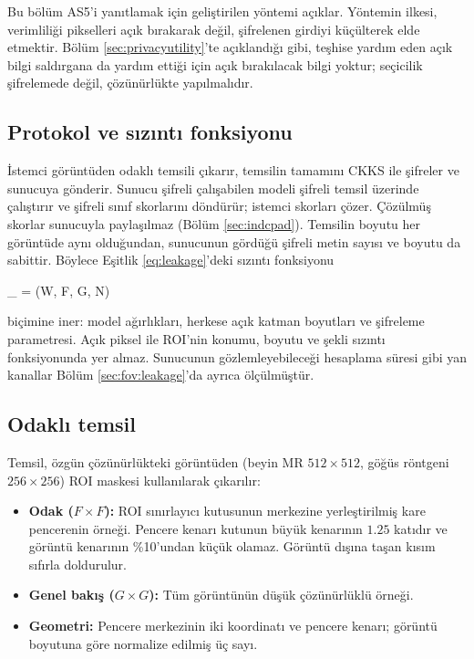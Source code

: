 Bu bölüm AS5'i yanıtlamak için geliştirilen yöntemi açıklar. Yöntemin ilkesi, verimliliği pikselleri açık bırakarak değil, şifrelenen girdiyi küçülterek elde etmektir. Bölüm \ref{sec:privacyutility}'te açıklandığı gibi, teşhise yardım eden açık bilgi saldırgana da yardım ettiği için açık bırakılacak bilgi yoktur; seçicilik şifrelemede değil, çözünürlükte yapılmalıdır.

\subsection{Protokol ve sızıntı fonksiyonu}\label{sec:fov:protocol}

İstemci görüntüden odaklı temsili çıkarır, temsilin tamamını CKKS ile şifreler ve sunucuya gönderir. Sunucu şifreli çalışabilen modeli şifreli temsil üzerinde çalıştırır ve şifreli sınıf skorlarını döndürür; istemci skorları çözer. Çözülmüş skorlar sunucuyla paylaşılmaz (Bölüm \ref{sec:indcpad}). Temsilin boyutu her görüntüde aynı olduğundan, sunucunun gördüğü şifreli metin sayısı ve boyutu da sabittir. Böylece Eşitlik \ref{eq:leakage}'deki sızıntı fonksiyonu

\be
{}_{} = \left(W,\; F,\; G,\; N\right)
\label{eq:leakagefov}
\ee

\noindent biçimine iner: model ağırlıkları, herkese açık katman boyutları ve şifreleme parametresi. Açık piksel ile ROI'nin konumu, boyutu ve şekli sızıntı fonksiyonunda yer almaz. Sunucunun gözlemleyebileceği hesaplama süresi gibi yan kanallar Bölüm \ref{sec:fov:leakage}'da ayrıca ölçülmüştür.

\subsection{Odaklı temsil}\label{sec:fov:rep}

Temsil, özgün çözünürlükteki görüntüden (beyin MR $512 \times 512$, göğüs röntgeni $256 \times 256$) ROI maskesi kullanılarak çıkarılır:

\begin{itemize}
\item \textbf{Odak ($F \times F$):} ROI sınırlayıcı kutusunun merkezine yerleştirilmiş kare pencerenin örneği. Pencere kenarı kutunun büyük kenarının $1.25$ katıdır ve görüntü kenarının \%10'undan küçük olamaz. Görüntü dışına taşan kısım sıfırla doldurulur.
\item \textbf{Genel bakış ($G \times G$):} Tüm görüntünün düşük çözünürlüklü örneği.
\item \textbf{Geometri:} Pencere merkezinin iki koordinatı ve pencere kenarı; görüntü boyutuna göre normalize edilmiş üç sayı.
\end{itemize}

